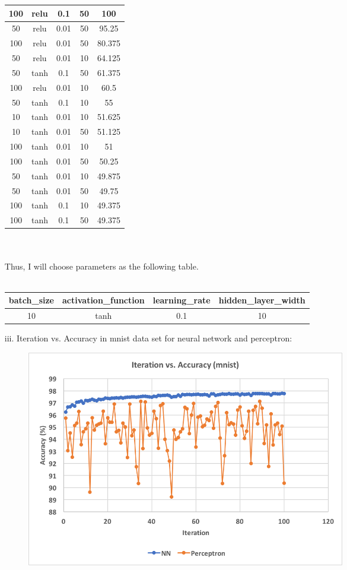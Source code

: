 \begin{itemize}
\begin{tabular}{ | c | c | c | c | c | }
		100 & relu & 0.1 & 50 & 100 \\ \hline
		50 & relu & 0.01 & 50 & 95.25 \\ \hline
		100 & relu & 0.01 & 50 & 80.375 \\ \hline
		50 & relu & 0.01 & 10 & 64.125 \\ \hline
		50 & tanh & 0.1 & 50 & 61.375 \\ \hline
		100 & relu & 0.01 & 10 & 60.5 \\ \hline
		50 & tanh & 0.1 & 10 & 55 \\ \hline
		10 & tanh & 0.01 & 10 & 51.625 \\ \hline
		10 & tanh & 0.01 & 50 & 51.125 \\ \hline
		100 & tanh & 0.01 & 10 & 51 \\ \hline
		100 & tanh & 0.01 & 50 & 50.25 \\ \hline
		50 & tanh & 0.01 & 10 & 49.875 \\ \hline
		50 & tanh & 0.01 & 50 & 49.75 \\ \hline
		100 & tanh & 0.1 & 10 & 49.375 \\ \hline
		100 & tanh & 0.1 & 50 & 49.375 \\ \hline
	\end{tabular}
	\\\\
	Thus, I will choose parameters as the following table.\\\\
	\begin{tabular}{ | c | c | c | c | }
		\hline
		batch\_size & activation\_function & learning\_rate & hidden\_layer\_width\\ \hline
		10 & tanh & 0.1 & 10  \\ \hline
	\end{tabular}
	\clearpage
	\item[iii.]
	Iteration vs. Accuracy in mnist data set for neural network and perceptron: 
	\begin{figure}[h]
  		\centering
    	\includegraphics[width=0.7\textwidth]{fig4.png}

\end{figure}
\end{itemize}
